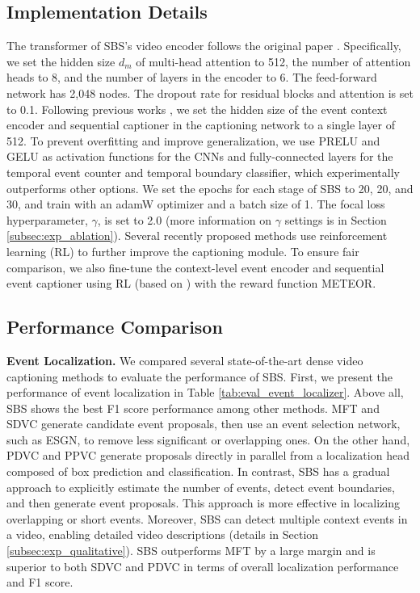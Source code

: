 \subsection{Implementation Details}
\label{subsec:exp_impl}
The transformer of SBS's video encoder follows the original paper \cite{vaswani2017attention}.
Specifically, we set the hidden size $d_m$ of multi-head attention to 512, the number of attention heads to 8, and the number of layers in the encoder to 6. The feed-forward network has 2,048 nodes.
The dropout rate for residual blocks and attention is set to 0.1.
Following previous works \cite{mun2019streamlined,wang2021end}, we set the hidden size of the event context encoder and sequential captioner in the captioning network to a single layer of 512.
To prevent overfitting and improve generalization, we use PRELU \cite{he2015delving} and GELU \cite{hendrycks2016gaussian} as activation functions for the CNNs and fully-connected layers for the temporal event counter and temporal boundary classifier, which experimentally outperforms other options.
We set the epochs for each stage of SBS to 20, 20, and 30, and train with an adamW optimizer \cite{loshchilov2017decoupled} and a batch size of 1.
The focal loss hyperparameter, $\gamma$, is set to 2.0 (more information on $\gamma$ settings is in Section \ref{subsec:exp_ablation}).
Several recently proposed methods \cite{mun2019streamlined,wang2020event,deng2021sketch} use reinforcement learning (RL) to further improve the captioning module.
To ensure fair comparison, we also fine-tune the context-level event encoder and sequential event captioner using RL (based on \cite{rennie2017self}) with the reward function METEOR.

\subsection{Performance Comparison}
\label{subsec:exp_comparison}

\textbf{Event Localization.}
We compared several state-of-the-art dense video captioning methods to evaluate the performance of SBS. First, we present the performance of event localization in Table \ref{tab:eval_event_localizer}.
Above all, SBS shows the best F1 score performance among other methods.
MFT and SDVC generate candidate event proposals, then use an event selection network, such as ESGN, to remove less significant or overlapping ones. On the other hand, PDVC and PPVC generate proposals directly in parallel from a localization head composed of box prediction and classification.
In contrast, SBS has a gradual approach to explicitly estimate the number of events, detect event boundaries, and then generate event proposals. This approach is more effective in localizing overlapping or short events.
Moreover, SBS can detect multiple context events in a video, enabling detailed video descriptions (details in Section \ref{subsec:exp_qualitative}).
SBS outperforms MFT by a large margin and is superior to both SDVC and PDVC in terms of overall localization performance and F1 score.


